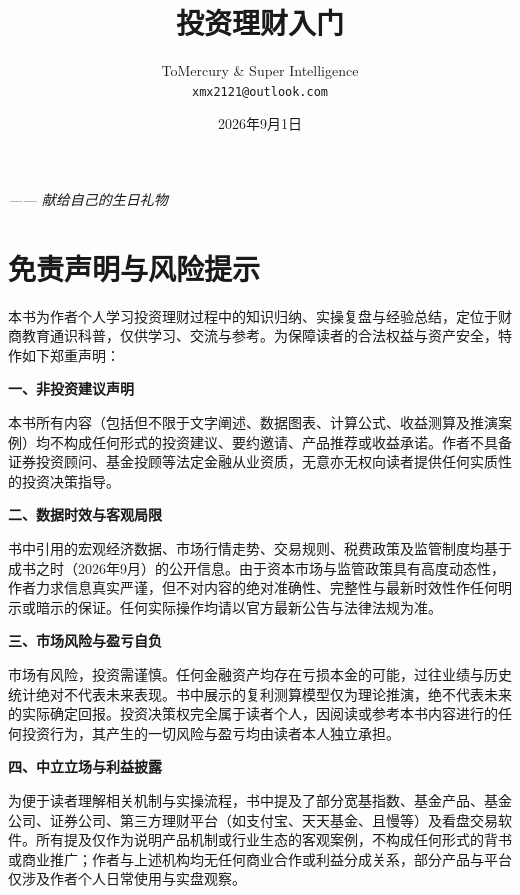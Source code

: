 \documentclass[12pt,openany]{book}
\title{\Huge\textbf{投资理财入门}}
\author{ToMercury \& Super Intelligence \\ \small\texttt{xmx2121@outlook.com}}
\date{2026年9月1日}
\newcommand{\subhead}[1]{%
    \par\vspace{0.5\baselineskip}%
    \noindent\textbf{#1}\par%
    \vspace{0.5\baselineskip}%
}
\begin{document}
\frontmatter
\maketitle
\thispagestyle{empty}

\thispagestyle{empty}
\vspace*{\fill}
\begin{center}
    {\large\textit{—— \quad 献给自己的生日礼物}}
\end{center}
\vspace*{\fill}
\newpage

\setcounter{page}{1}

\chapter*{免责声明与风险提示}

\small
\setlength{\parindent}{2em}

本书为作者个人学习投资理财过程中的知识归纳、实操复盘与经验总结，定位于财商教育通识科普，仅供学习、交流与参考。为保障读者的合法权益与资产安全，特作如下郑重声明：

\subhead{一、非投资建议声明}
本书所有内容（包括但不限于文字阐述、数据图表、计算公式、收益测算及推演案例）均不构成任何形式的投资建议、要约邀请、产品推荐或收益承诺。作者不具备证券投资顾问、基金投顾等法定金融从业资质，无意亦无权向读者提供任何实质性的投资决策指导。

\subhead{二、数据时效与客观局限}
书中引用的宏观经济数据、市场行情走势、交易规则、税费政策及监管制度均基于成书之时（2026年9月）的公开信息。由于资本市场与监管政策具有高度动态性，作者力求信息真实严谨，但不对内容的绝对准确性、完整性与最新时效性作任何明示或暗示的保证。任何实际操作均请以官方最新公告与法律法规为准。

\subhead{三、市场风险与盈亏自负}
市场有风险，投资需谨慎。任何金融资产均存在亏损本金的可能，过往业绩与历史统计绝对不代表未来表现。书中展示的复利测算模型仅为理论推演，绝不代表未来的实际确定回报。投资决策权完全属于读者个人，因阅读或参考本书内容进行的任何投资行为，其产生的一切风险与盈亏均由读者本人独立承担。

\subhead{四、中立立场与利益披露}
为便于读者理解相关机制与实操流程，书中提及了部分宽基指数、基金产品、基金公司、证券公司、第三方理财平台（如支付宝、天天基金、且慢等）及看盘交易软件。所有提及仅作为说明产品机制或行业生态的客观案例，不构成任何形式的背书或商业推广；作者与上述机构均无任何商业合作或利益分成关系，部分产品与平台仅涉及作者个人日常使用与实盘观察。
\end{document}
